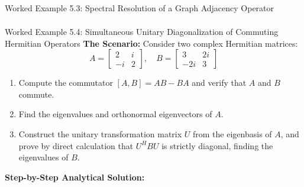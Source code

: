\begin{examplebox}{Worked Example 5.3: Spectral Resolution of a Graph Adjacency Operator}
\begin{align}
\end{align}
\end{examplebox}

\begin{examplebox}{Worked Example 5.4: Simultaneous Unitary Diagonalization of Commuting Hermitian Operators}
\label{ex:w05_simultaneous_diag}
\textbf{The Scenario:}
Consider two complex Hermitian matrices:
\begin{equation*}
A = \begin{bmatrix} 2 & i \\ -i & 2 \end{bmatrix}, \quad B = \begin{bmatrix} 3 & 2i \\ -2i & 3 \end{bmatrix}
\end{equation*}
\begin{enumerate}
    \item Compute the commutator $[A, B] = AB - BA$ and verify that $A$ and $B$ commute.
    \item Find the eigenvalues and orthonormal eigenvectors of $A$.
    \item Construct the unitary transformation matrix $U$ from the eigenbasis of $A$, and prove by direct calculation that $U^H B U$ is strictly diagonal, finding the eigenvalues of $B$.
\end{enumerate}

\tcblower
\textbf{Step-by-Step Analytical Solution:}


\end{examplebox}
